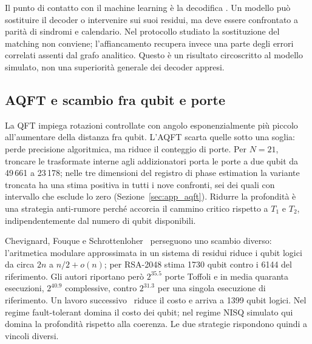 Il punto di contatto con il machine learning è la decodifica
\cite{torlaiMelko2017,alphaqubit2024}. Un modello può sostituire il decoder o
intervenire sui suoi residui, ma deve essere confrontato a parità di sindromi e
calendario. Nel protocollo studiato la sostituzione del matching non conviene;
l'affiancamento recupera invece una parte degli errori correlati assenti dal
grafo analitico. Questo è un risultato circoscritto al modello simulato, non una
superiorità generale dei decoder appresi.

\subsection{AQFT e scambio fra qubit e porte}
\label{app:aqft_estesa}

La \ac{QFT} impiega rotazioni controllate con angolo esponenzialmente più
piccolo all'aumentare della distanza fra qubit. L'\ac{AQFT} scarta quelle sotto
una soglia: perde precisione algoritmica, ma riduce il conteggio di porte. Per
$N=21$, troncare le trasformate interne agli addizionatori porta le porte a due
qubit da 49\,661 a 23\,178; nelle tre dimensioni del registro di phase
estimation la variante troncata ha una stima positiva in tutti i nove
confronti, sei dei quali con intervallo che esclude lo zero
(Sezione~\ref{sec:app_aqft}). Ridurre la profondità è una strategia anti-rumore perché accorcia il
cammino critico rispetto a $T_1$ e $T_2$, indipendentemente dal numero di qubit
disponibili.

Chevignard, Fouque e Schrottenloher~\cite{chevignard2025} perseguono uno scambio
diverso: l'aritmetica modulare approssimata in un sistema di residui riduce i
qubit logici da circa $2n$ a $n/2+o(n)$; per RSA-2048 stima 1730 qubit contro i
6144 del riferimento. Gli autori riportano però $2^{35.5}$ porte Toffoli e in
media quaranta esecuzioni, $2^{40.9}$ complessive, contro $2^{31.3}$ per una
singola esecuzione di riferimento. Un lavoro successivo~\cite{gidney2025}
riduce il costo e arriva a 1399 qubit logici. Nel regime fault-tolerant domina
il costo dei qubit; nel regime NISQ simulato qui domina la profondità rispetto
alla coerenza. Le due strategie rispondono quindi a vincoli diversi.

